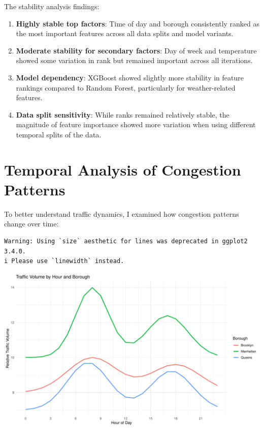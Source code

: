 \documentclass[
  letterpaper,
  DIV=11,
  numbers=noendperiod]{scrreprt}
\begin{document}
The stability analysis findings:

\begin{enumerate}
\def\labelenumi{\arabic{enumi}.}
\item
  \textbf{Highly stable top factors}: Time of day and borough
  consistently ranked as the most important features across all data
  splits and model variants.
\item
  \textbf{Moderate stability for secondary factors}: Day of week and
  temperature showed some variation in rank but remained important
  across all iterations.
\item
  \textbf{Model dependency}: XGBoost showed slightly more stability in
  feature rankings compared to Random Forest, particularly for
  weather-related features.
\item
  \textbf{Data split sensitivity}: While ranks remained relatively
  stable, the magnitude of feature importance showed more variation when
  using different temporal splits of the data.
\end{enumerate}

\section{Temporal Analysis of Congestion
Patterns}\label{temporal-analysis-of-congestion-patterns}

To better understand traffic dynamics, I examined how congestion
patterns change over time:

\begin{verbatim}
Warning: Using `size` aesthetic for lines was deprecated in ggplot2 3.4.0.
i Please use `linewidth` instead.
\end{verbatim}

\includegraphics[width=1\textwidth,height=\textheight]{figures/temporal-patterns-1.pdf}
\end{document}
